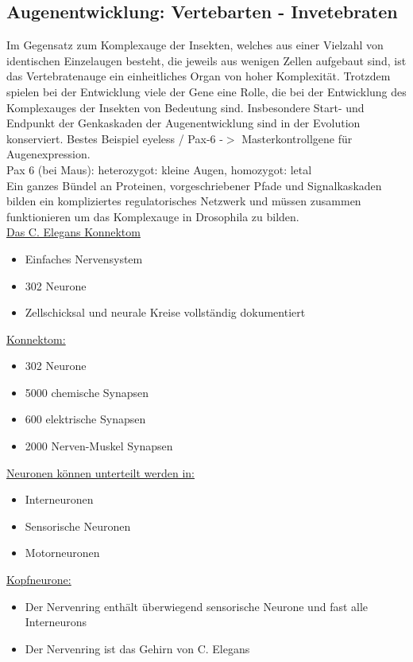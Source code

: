 \subsection{Augenentwicklung: Vertebarten - Invetebraten}
Im Gegensatz zum Komplexauge der Insekten, welches aus einer Vielzahl von identischen Einzelaugen besteht, die jeweils aus wenigen Zellen aufgebaut sind, ist das Vertebratenauge ein einheitliches Organ von hoher Komplexität. Trotzdem spielen bei der Entwicklung viele der Gene eine Rolle, die bei der Entwicklung des Komplexauges der Insekten von Bedeutung sind. Insbesondere Start- und Endpunkt der Genkaskaden der Augenentwicklung sind in der Evolution konserviert. Bestes Beispiel eyeless / Pax-6 -$>$ Masterkontrollgene für Augenexpression.\\
Pax 6 (bei Maus): heterozygot: kleine Augen, homozygot: letal\\

Ein ganzes Bündel an Proteinen, vorgeschriebener Pfade und Signalkaskaden bilden ein kompliziertes regulatorisches Netzwerk und müssen zusammen funktionieren um das Komplexauge in Drosophila zu bilden.\\

\underline{Das C. Elegans Konnektom}
\begin{itemize}
	\item Einfaches Nervensystem
	\item 302 Neurone
	\item Zellschicksal und neurale Kreise vollständig dokumentiert
\end{itemize}

\underline{Konnektom:}
\begin{itemize}
	\item 302 Neurone
	\item 5000 chemische Synapsen
	\item 600 elektrische Synapsen
	\item 2000 Nerven-Muskel Synapsen
\end{itemize}

\underline{Neuronen können unterteilt werden in:}
\begin{itemize}
	\item Interneuronen
	\item Sensorische Neuronen
	\item Motorneuronen
\end{itemize}

\underline{Kopfneurone:}
\begin{itemize}
	\item Der Nervenring enthält überwiegend sensorische Neurone und fast alle Interneurons
	\item Der Nervenring ist das Gehirn von C. Elegans
\end{itemize}

